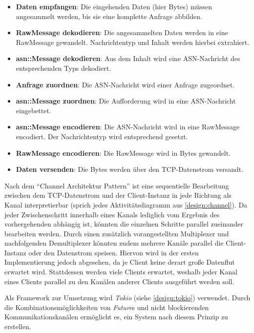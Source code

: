 \begin{itemize}
	\item \textbf{Daten empfangen}: Die eingehenden Daten (hier Bytes) müssen angesammelt werden, bis sie eine komplette Anfrage abbilden.
	\item \textbf{RawMessage dekodieren}: Die angesammelten Daten werden in eine RawMessage gewandelt. Nachrichtentyp und Inhalt werden hierbei extrahiert.
	\item \textbf{asn::Message dekodieren}: Aus dem Inhalt wird eine ASN-Nachricht des entsprechenden Typs dekodiert.
	\item \textbf{Anfrage zuordnen}: Die ASN-Nachricht wird einer Anfrage zugeordnet.
	\item \textbf{asn::Message zuordnen}: Die Aufforderung wird in eine ASN-Nachricht eingebettet.
	\item \textbf{asn::Message encodieren}: Die ASN-Nachricht wird in eine RawMessage encodiert. Der Nachrichtentyp wird entsprechend gesetzt.
	\item \textbf{RawMessage encodieren}: Die RawMessage wird in Bytes gewandelt.
	\item \textbf{Daten versenden}: Die Bytes werden über den TCP-Datenstrom versandt.
\end{itemize}

Nach dem \enquote{Channel Architektur Pattern} ist eine sequentielle Bearbeitung zwischen dem TCP-Datenstrom und der Client-Instanz in jede Richtung als Kanal interpretierbar (sprich jedes Aktivitätsdiagramm aus \autoref{design:channel}).
Da jeder Zwischenschritt innerhalb eines Kanals lediglich vom Ergebnis des vorhergehenden abhängig ist, könnten die einzelnen Schritte parallel zueinander bearbeiten werden.
Durch einen zusätzlich vorangestellten Multiplexer und nachfolgenden Demultiplexer könnten zudem mehrere Kanäle parallel die Client-Instanz oder den Datenstrom speisen.
Hiervon wird in der ersten Implementierung jedoch abgesehen, da je Client keine derart große Datenflut erwartet wird.
Stattdessen werden viele Clients erwartet, weshalb jeder Kanal eines Clients parallel zu den Kanälen anderer Clients ausgeführt werden soll.

Als Framework zur Umsetzung wird \textit{Tokio} (siehe \autoref{design:tokio}) verwendet.
Durch die Kombinationsmöglichkeiten von \textit{Future}s und nicht blockierenden Kommunikationskanälen ermöglicht es, ein System nach diesem Prinzip zu erstellen.


